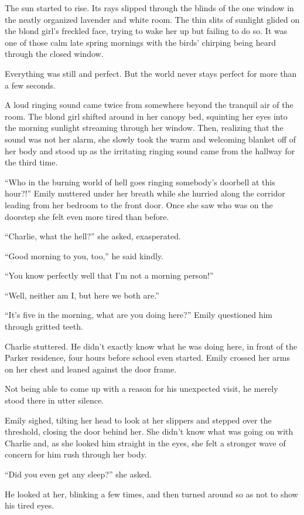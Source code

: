 The sun started to rise. Its rays slipped through the blinds of the one window in the neatly organized lavender and white room. The thin slits of sunlight glided on the blond girl's freckled face, trying to wake her up but failing to do so. It was one of those calm late spring mornings with the birds' chirping being heard through the closed window.

Everything was still and perfect. But the world never stays perfect for more than a few seconds.

A loud ringing sound came twice from somewhere beyond the tranquil air of the room. The blond girl shifted around in her canopy bed, squinting her eyes into the morning sunlight streaming through her window. Then, realizing that the sound was not her alarm, she slowly took the warm and welcoming blanket off of her body and stood up as the irritating ringing sound came from the hallway for the third time.

“Who in the burning world of hell goes ringing somebody's doorbell at this hour?!” Emily muttered under her breath while she hurried along the corridor leading from her bedroom to the front door. Once she saw who was on the doorstep she felt even more tired than before.

“Charlie, what the hell?” she asked, exasperated.

“Good morning to you, too,” he said kindly.

“You know perfectly well that I'm not a morning person!”

“Well, neither am I, but here we both are.”

“It's five in the morning, what are you doing here?” Emily questioned him through gritted teeth.

Charlie stuttered. He didn't exactly know what he was doing here, in front of the Parker residence, four hours before school even started. Emily crossed her arms on her chest and leaned against the door frame.

Not being able to come up with a reason for his unexpected visit, he merely stood there in utter silence.

Emily sighed, tilting her head to look at her slippers and stepped over the threshold, closing the door behind her. She didn't know what was going on with Charlie and, as she looked him straight in the eyes, she felt a stronger wave of concern for him rush through her body.

“Did you even get any sleep?” she asked.

He looked at her, blinking a few times, and then turned around so as not to show his tired eyes.

